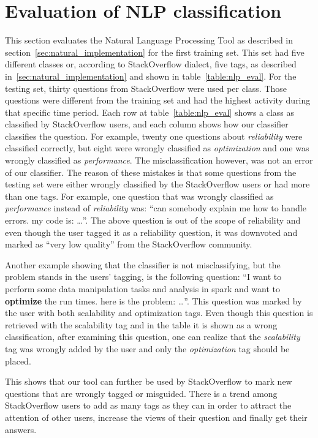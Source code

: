 \section{Evaluation of NLP classification}
\label{sec:nlp_evaluation}
This section evaluates the Natural Language Processing Tool as described in section~\ref{sec:natural_implementation} for the first training set. This set had five different classes or, according to StackOverflow dialect, five tags, as described in~\ref{sec:natural_implementation} and shown in table~\ref{table:nlp_eval}. For the testing set, thirty questions from StackOverflow were used per class. Those questions were different from the training set and had the highest activity during that specific time period. Each row at table~\ref{table:nlp_eval} shows a class as classified by StackOverflow users, and each column shows how our classifier classifies the question. For example, twenty one questions about \emph{reliability} were classified correctly, but eight were wrongly classified as \emph{optimization} and one was wrongly classified as \emph{performance}. The misclassification however, was not an error of our classifier. The reason of these mistakes is that  some questions from the testing set were either wrongly classified by the StackOverflow users or had more than one tags. For example, one question that was wrongly classified as \emph{performance} instead of \emph{reliability} was: ``can somebody explain me how to handle errors. my code is: \ldots''. The above question is out of the scope of reliability and even though the user tagged it as a reliability question, it was downvoted and marked as ``very low quality'' from the StackOverflow community.

Another example showing that the classifier is not misclassifying, but the problem stands in the users' tagging, is the following question:
``I want to perform some data manipulation tasks and analysis in spark and want to \textbf{optimize} the run times. 
here is the problem: \ldots ''. 
This question was marked by the user with both scalability and optimization tags. Even though this question is retrieved with the scalability tag and in the table it is shown as a wrong classification, after examining this question, one can realize that the \emph{scalability} tag was wrongly added by the user and only the \emph{optimization} tag should be placed.

This shows that our tool can further be used by StackOverflow to mark new questions that are wrongly tagged or misguided. There is a trend among StackOverflow users to add as many tags as they can in order to attract the attention of other users, increase the views of their question and finally get their answers.  

